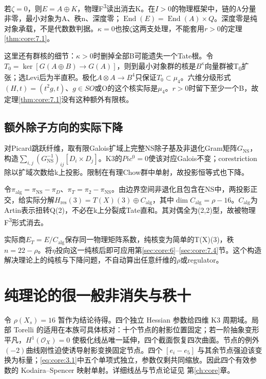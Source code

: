 \documentclass[11pt,a4paper,oneside]{ctexrep}
\theoremstyle{cnplain}
\theoremstyle{definition}
\theoremstyle{remark}
\begin{document}
若\(\zeta =0\)，则\(E=A\oplus K\)，物理F\textsuperscript{3}读出消去K。在\(I>0\)的物理框架中，链的A分量非零，最小对象为A、秩n、深度零；\(\operatorname{End}(E)=\operatorname{End}(A)\times Q\)。深度零是纯对象承载，不是代数数判据。\(\kappa =0\)也按\(\zeta \)这两支处理，不能套用\(r>0\)的定理\ref{thm:core:7.1}。

这里还有群核的细节：\(\kappa >0\)时删掉全部B可能遗失一个Tate根。令\(T_{0}=\operatorname{ker}[G(A\oplus B)\to G(A)]\)，则到最小对象群的核是\(B^\kappa \)向量群被T\textsubscript{0}扩张；选Levi后为半直积。极化\(A\otimes A\to B^{4}\)只保证\(T_{0}\subset \mu _{4}\)。六维分级形式\((H,t)=(t^{2}g,t)\)、\(g\in SO\)或O的这个核实际是\(\mu _{4}\)。\(r>0\)时留下至少一个B，故定理\ref{thm:core:7.1}没有这种额外有限核。

\subsection{额外除子方向的实际下降}\label{sec:core:7.5}

对Picard跳跃纤维，取有限Galois扩域上完整NS除子基及非退化Gram矩阵\(G_{\mathrm{NS}}\)，构造\(\sum_{i,j}(G_{\mathrm{NS}}^{-1})_{ij}[D_i\times D_j]\)。K3的\(Pic^{0}=0\)使该对应Galois不变；corestriction除以扩域次数给k上投影。限制在有理Chow群中单射，故投影恒等式也下降。

令\(\pi _{\mathrm{alg}}=\pi _{\mathrm{NS}}- \pi _D\)、\(\pi _T=\pi _{2}- \pi _{\mathrm{NS}}\)。由边界空间非退化且包含在NS中，两投影正交，给实际分解\(H_{\mathrm{res}}(3)=T(X)(3)\oplus C_{\mathrm{alg}}\)，其中\(\dim C_{\mathrm{alg}}=\rho - 16\)。\(C_{\mathrm{alg}}\)为Artin表示扭转Q(2)，不必在k上分裂成Tate直和。其对偶全为(2,2)型，故被物理F\textsuperscript{3}形式消去。

实际商\(E_T=E/C_{\mathrm{alg}}\)保存同一物理矩阵系数，纯核变为简单的T(X)(3)，秩\(n=22- \rho \)。将\(\eta \)投向这一纯核后即可应用第\ref{sec:core:6}--\ref{sec:core:7.4}节。这个构造解决理论上的纯核与下降问题，不自动算出任意纤维的\(\rho \)或regulator。

\section{纯理论的很一般非消失与秩十}\label{sec:core:8}

令 \(\rho(X_s)=16\) 暂作为结论待得。四个独立 Hessian 参数给四维 K3 周期域。局部 Torelli 的适用在本族可具体核对：十个节点的射影位置固定；若一阶抽象变形平凡，\(H^1(\mathcal O_X)=0\) 使极化线丛唯一延伸，四个截面恢复四次曲面。节点的例外\((- 2)\)曲线刚性迫使诱导射影变换固定节点。四个 \([e_i-e_5]\) 与其余节点强迫该变换为标量；\eqref{eq:core:3.1}中五个单项式独立，参数仅剩共同缩放。因此四个有效参数的 Kodaira--Spencer 映射单射。详细线丛与节点论证见 第\ref{ch:core}章。
\end{document}
